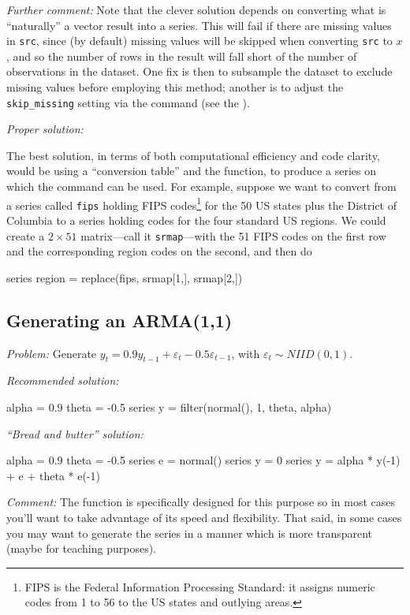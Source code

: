 \emph{Further comment:} Note that the clever solution depends on
converting what is ``naturally'' a vector result into a series. This
will fail if there are missing values in \texttt{src}, since (by
default) missing values will be skipped when converting \texttt{src}
to $x$, and so the number of rows in the result will fall short of the
number of observations in the dataset. One fix is then to subsample
the dataset to exclude missing values before employing this method;
another is to adjust the \texttt{skip\_missing} setting via the
 command (see the \GCR).

\emph{Proper solution:}

The best solution, in terms of both computational efficiency and code
clarity, would be using a ``conversion table'' and the 
function, to produce a series on which the  command can
be used. For example, suppose we want to convert from a series called
\texttt{fips} holding FIPS codes\footnote{FIPS is the Federal
  Information Processing Standard: it assigns numeric codes from 1 to
  56 to the US states and outlying areas.} for the 50 US states plus
the District of Columbia to a series holding codes for the four
standard US regions. We could create a $2 \times 51$ matrix---call it
\texttt{srmap}---with the 51 FIPS codes on the first row and the
corresponding region codes on the second, and then do
\begin{code}
series region = replace(fips, srmap[1,], srmap[2,])
\end{code}

\subsection{Generating an ARMA(1,1)}

\emph{Problem:} Generate $y_t = 0.9 y_{t-1} + \varepsilon_t - 0.5
\varepsilon_{t-1}$, with $\varepsilon_t \sim N\!I\!I\!D(0,1)$.

\emph{Recommended solution:}
\begin{code}
alpha = 0.9
theta = -0.5
series y = filter(normal(), {1, theta}, alpha)
\end{code}

\emph{``Bread and butter'' solution:}
\begin{code}
alpha = 0.9
theta = -0.5
series e = normal()
series y = 0
series y = alpha * y(-1) + e + theta * e(-1)
\end{code}

\emph{Comment:} The  function is specifically designed for
this purpose so in most cases you'll want to take advantage of its
speed and flexibility. That said, in some cases you may want to
generate the series in a manner which is more transparent (maybe for
teaching purposes). 

